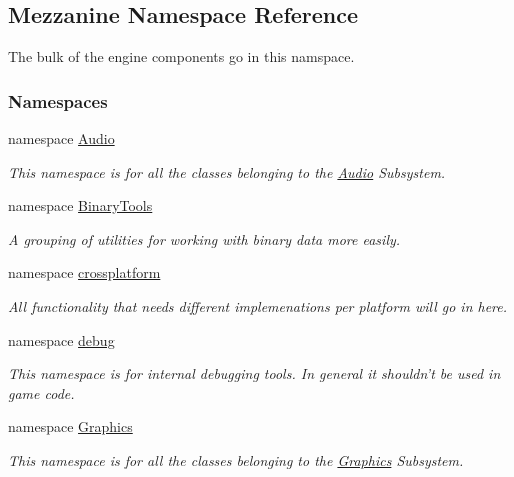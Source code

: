 \hypertarget{namespaceMezzanine}{\subsection{Mezzanine Namespace Reference}
\label{namespaceMezzanine}
}


The bulk of the engine components go in this namspace.  


\subsubsection*{Namespaces}
\begin{DoxyCompactItemize}
\item 
namespace \hyperlink{namespaceMezzanine_1_1Audio}{Audio}
\begin{DoxyCompactList}\small\item\em This namespace is for all the classes belonging to the \hyperlink{namespaceMezzanine_1_1Audio}{Audio} Subsystem. \end{DoxyCompactList}\item 
namespace \hyperlink{namespaceMezzanine_1_1BinaryTools}{Binary\-Tools}
\begin{DoxyCompactList}\small\item\em A grouping of utilities for working with binary data more easily. \end{DoxyCompactList}\item 
namespace \hyperlink{namespaceMezzanine_1_1crossplatform}{crossplatform}
\begin{DoxyCompactList}\small\item\em All functionality that needs different implemenations per platform will go in here. \end{DoxyCompactList}\item 
namespace \hyperlink{namespaceMezzanine_1_1debug}{debug}
\begin{DoxyCompactList}\small\item\em This namespace is for internal debugging tools. In general it shouldn't be used in game code. \end{DoxyCompactList}\item 
namespace \hyperlink{namespaceMezzanine_1_1Graphics}{Graphics}
\begin{DoxyCompactList}\small\item\em This namespace is for all the classes belonging to the \hyperlink{namespaceMezzanine_1_1Graphics}{Graphics} Subsystem. \end{DoxyCompactList}\item 

\end{DoxyCompactItemize}
